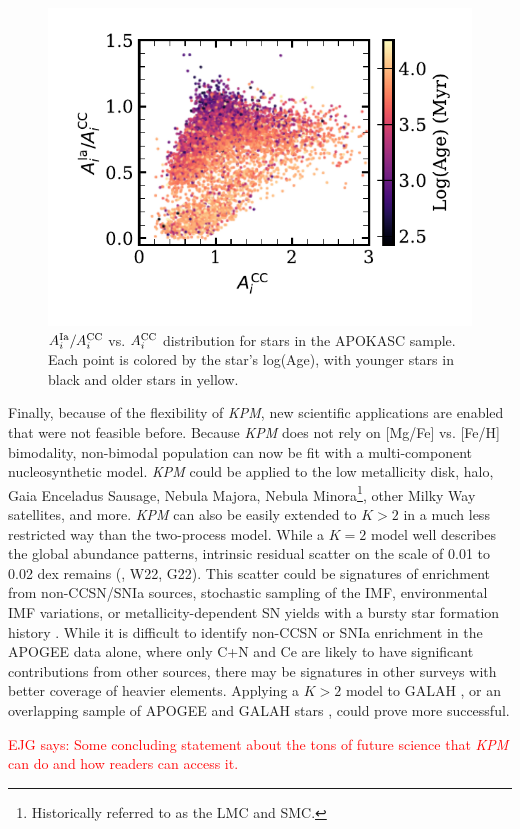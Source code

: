 \documentclass[modern]{aastex631}
\newcommand{\Acc}{A^{\rm CC}_{i}}
\newcommand{\AIa}{A^{\rm Ia}_{i}}
\newcommand{\ejg}[1]{\textcolor{red}{EJG says: #1}}
\newcommand{\name}{\textsl{KPM}}
\begin{document}
\begin{figure}[htb!]
    \centering
    \includegraphics[width=.6\textwidth]{Paper/Figures/AIaAcc_age.pdf}
    \caption{$\AIa/\Acc$ vs. $\Acc$ distribution for stars in the APOKASC sample. Each point is colored by the star's log(Age), with younger stars in black and older stars in yellow.
    \label{fig:age}}
\end{figure}

Finally, because of the flexibility of \name{}, new scientific applications are enabled that were not feasible before. Because \name{} does not rely on [Mg/Fe] vs. [Fe/H] bimodality, non-bimodal population can now be fit with a multi-component nucleosynthetic model. \name{} could be applied to the low metallicity disk, halo, Gaia Enceladus Sausage, Nebula Majora, Nebula Minora\footnote{Historically referred to as the LMC and SMC.}, other Milky Way satellites, and more. \name{} can also be easily extended to $K>2$ in a much less restricted way than the two-process model. While a $K=2$ model well describes the global abundance patterns, intrinsic residual scatter on the scale of 0.01 to 0.02 dex remains (\citealp{ting2022}, W22, G22). This scatter could be signatures of enrichment from non-CCSN/SNIa sources, stochastic sampling of the IMF, environmental IMF variations, or metallicity-dependent SN yields with a bursty star formation history \citep[e.g.][]{belokurov2022, griffith2023}. While it is difficult to identify non-CCSN or SNIa enrichment in the APOGEE data alone, where only C+N and Ce are likely to have significant contributions from other sources, there may be signatures in other surveys with better coverage of heavier elements. Applying a $K>2$ model to GALAH \citep{buder2021}, or an overlapping sample of APOGEE and GALAH stars \citep{nandakumar2022}, could prove more successful.

\ejg{Some concluding statement about the tons of future science that \name{} can do and how readers can access it.}
\end{document}
